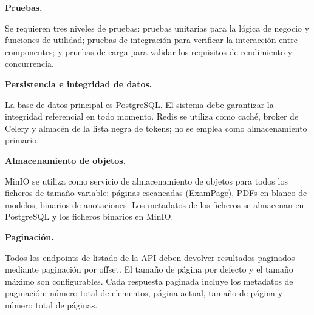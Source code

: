 \begin{nonfunctional}
  \item \textbf{Pruebas.}

  Se requieren tres niveles de pruebas: pruebas unitarias para la lógica de negocio y funciones de utilidad; pruebas de integración para verificar la interacción entre componentes; y pruebas de carga para validar los requisitos de rendimiento y concurrencia.

  \item \textbf{Persistencia e integridad de datos.}

  La base de datos principal es PostgreSQL. El sistema debe garantizar la integridad referencial en todo momento. Redis se utiliza como caché, broker de Celery y almacén de la lista negra de tokens; no se emplea como almacenamiento primario.

  \item \textbf{Almacenamiento de objetos.}

  MinIO se utiliza como servicio de almacenamiento de objetos para todos los ficheros de tamaño variable: páginas escaneadas (ExamPage), PDFs en blanco de modelos, binarios de anotaciones. Los metadatos de los ficheros se almacenan en PostgreSQL y los ficheros binarios en MinIO.

  \item \textbf{Paginación.}

  Todos los endpoints de listado de la API deben devolver resultados paginados mediante paginación por offset. El tamaño de página por defecto y el tamaño máximo son configurables. Cada respuesta paginada incluye los metadatos de paginación: número total de elementos, página actual, tamaño de página y número total de páginas.

\end{nonfunctional}
